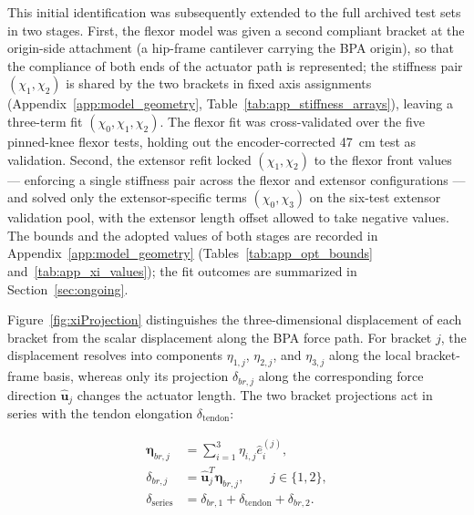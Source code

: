 This initial identification was subsequently extended to the full archived test sets in two stages. First, the flexor model was given a second compliant bracket at the origin-side attachment (a hip-frame cantilever carrying the BPA origin), so that the compliance of both ends of the actuator path is represented; the stiffness pair $(\chi_{1}, \chi_{2})$ is shared by the two brackets in fixed axis assignments (Appendix~\ref{app:model_geometry}, Table~\ref{tab:app_stiffness_arrays}), leaving a three-term fit $(\chi_{0}, \chi_{1}, \chi_{2})$. The flexor fit was cross-validated over the five pinned-knee flexor tests, holding out the encoder-corrected \qty{47}{\cm} test as validation. Second, the extensor refit locked $(\chi_{1}, \chi_{2})$ to the flexor front values --- enforcing a single stiffness pair across the flexor and extensor configurations --- and solved only the extensor-specific terms $(\chi_{0}, \chi_{3})$ on the six-test extensor validation pool, with the extensor length offset allowed to take negative values. The bounds and the adopted values of both stages are recorded in Appendix~\ref{app:model_geometry} (Tables~\ref{tab:app_opt_bounds} and~\ref{tab:app_xi_values}); the fit outcomes are summarized in Section~\ref{sec:ongoing}.

Figure~\ref{fig:xiProjection} distinguishes the three-dimensional displacement of each bracket from the scalar displacement along the BPA force path. For bracket $j$, the displacement resolves into components $\eta_{1,j}$, $\eta_{2,j}$, and $\eta_{3,j}$ along the local bracket-frame basis, whereas only its projection $\delta_{br,j}$ along the corresponding force direction $\hat{\mathbf{u}}_j$ changes the actuator length. The two bracket projections act in series with the tendon elongation $\delta_{\mathrm{tendon}}$:

\begin{equation}
\begin{aligned}
\boldsymbol{\eta}_{br,j} &= \sum_{i=1}^{3}\eta_{i,j}\hat{e}_i^{(j)},\\
\delta_{br,j} &= \hat{\mathbf{u}}_j^T\boldsymbol{\eta}_{br,j}, \qquad j\in\{1,2\},\\
\delta_{\mathrm{series}} &= \delta_{br,1}+\delta_{\mathrm{tendon}}+\delta_{br,2}.
\end{aligned}
\label{eq:bracket_series_projection}
\end{equation}

